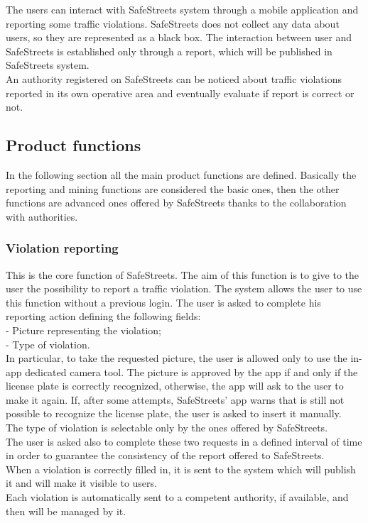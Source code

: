\documentclass{article}
\begin{document}
    	The users can interact with SafeStreets system through a mobile application and reporting some traffic violations.
    	SafeStreets does not collect any data about users, so they are represented as a black box. The interaction between user and SafeStreets is established only through 
    	a report, which will be published in SafeStreets system.\\
    	An authority registered on SafeStreets can be noticed about traffic violations reported in its own operative area and eventually evaluate if report is correct or not.
        
        \subsection{Product functions}
        In the following section all the main product functions are defined. Basically the reporting and mining functions are considered the basic ones, then the other functions are advanced ones offered by SafeStreets thanks to the collaboration with authorities.
        \subsubsection{Violation reporting}
        This is the core function of SafeStreets. The aim of this function is to give to the user the possibility to report a traffic violation. The system allows the user to use this function without a previous login. The user is asked to complete his reporting action defining the following fields:\\
        - Picture representing the violation;\\
        - Type of violation.\\
        In particular, to take the requested picture, the user is allowed only to use the in-app dedicated camera tool. The picture is approved by the app if and only if the license plate is correctly recognized, otherwise, the app will ask to the user to make it again. If, after some attempts, SafeStreets' app warns that is still not possible to recognize the license plate, the user is asked to insert it manually. \\The type of violation is selectable only by the ones offered by SafeStreets.\\ The user is asked also to complete these two requests in a defined interval of time in order to guarantee the consistency of the report offered to SafeStreets.\\
        When a violation is correctly filled in, it is sent to the system which will publish it and will make it visible to users.\\
         Each violation is automatically sent to a competent authority, if available, and then will be managed by it.
       
\end{document}
